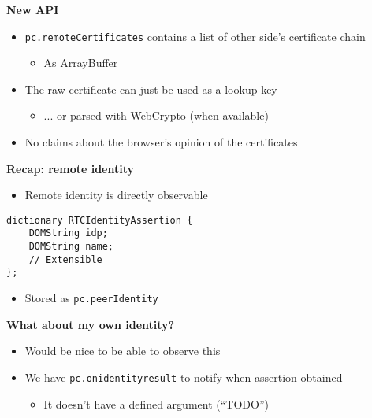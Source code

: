 \documentclass[helvetica]{seminar}
\newcommand{\heading}[1]{%
  \begin{center} 
    \large\bf 
    #1 
  \end{center} 
  \vspace{.4 in}}
\begin{document}
\begin{slide}
\heading{New API}

\begin{itemize}
\item \verb^pc.remoteCertificates^ contains a list of other side's certificate chain
  \begin{itemize}
    \item As ArrayBuffer
  \end{itemize}

\item The raw certificate can just be used as a lookup key
  \begin{itemize}
    \item ... or parsed with WebCrypto (when available)
  \end{itemize}

\item No claims about the browser's opinion of the certificates
\end{itemize}
\end{slide}


\begin{slide}
\heading{Recap: remote identity}

\begin{itemize}
\item Remote identity is directly observable
\end{itemize}

\begin{verbatim}
dictionary RTCIdentityAssertion {
    DOMString idp;
    DOMString name;
    // Extensible
};
\end{verbatim}

\begin{itemize}
\item Stored as \verb^pc.peerIdentity^
\end{itemize}

\end{slide}


\begin{slide}
\heading{What about my own identity?}

\begin{itemize}
\item Would be nice to be able to observe this
\item We have \verb^pc.onidentityresult^ to notify when assertion obtained
  \begin{itemize}
    \item It doesn't have a defined argument (``TODO'')
  \end{itemize}
\end{itemize}
\end{slide}
\end{document}
